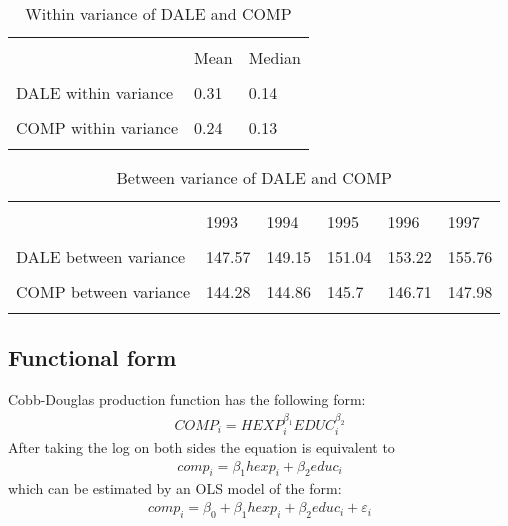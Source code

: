 \documentclass[12pt,a4paper]{article}\usepackage[]{graphicx}\usepackage[]{color}
\begin{document}
\begin{table}[htbp] \centering 
  \caption{Within variance of DALE and COMP} 
  \label{Within variance of DALE and COMP} 
  \normalsize
\begin{tabular}{p{5cm} p{1.5cm} p{1.5cm}} 
\\[-1.8ex]\hline 
\hline \\[-1.8ex] 
 & Mean & Median \\ 
\hline \\[-1.8ex] 
DALE within variance & 0.31 & 0.14 \\
\hline \\[-1.8ex] 
COMP within variance & 0.24 & 0.13 \\
\hline
\hline \\[-1.8ex] 
\end{tabular} 
\end{table} 

\begin{table}[htbp] \centering 
  \caption{Between variance of DALE and COMP} 
  \label{Between variance of DALE and COMP} 
  \normalsize
\begin{tabular}{p{5cm} p{1.2cm} p{1.2cm} p{1.2cm} p{1.2cm} p{1.2cm}} 
\\[-1.8ex]\hline 
\hline \\[-1.8ex] 
 & 1993 & 1994 & 1995 & 1996 & 1997 \\ 
\hline \\[-1.8ex] 
DALE between variance & 147.57 & 149.15 & 151.04 & 153.22 & 155.76 \\
\hline \\[-1.8ex] 
COMP between variance & 144.28 & 144.86 & 145.7 & 146.71 & 147.98 \\
\hline
\hline \\[-1.8ex] 
\end{tabular} 
\end{table}








\subsection{Functional form}
Cobb-Douglas production function has the following form:
\begin{gather}
COMP_i = HEXP_i^{\beta_1}EDUC_i^{\beta_2}
\end{gather}
After taking the log on both sides the equation is equivalent to
\begin{gather}
comp_i = \beta_1 hexp_i + \beta_2 educ_i
\end{gather}
which can be estimated by an OLS model of the form:
\begin{gather}
comp_i = \beta_0 + \beta_1 hexp_i + \beta_2 educ_i + \varepsilon_i
\end{gather}
\end{document}
